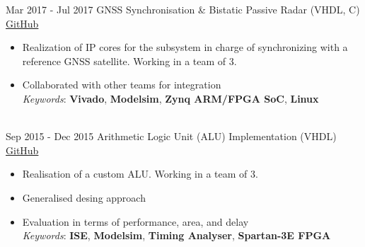 \documentclass[letterpaper]{twentysecondcv} %
\begin{document}
\begin{twenty}
	\twentyitem
    	{Mar 2017 -}
		{Jul 2017}
        {GNSS Synchronisation \& Bistatic Passive Radar (VHDL, C)}
        {\href{https://github.com/artic92/sistemi-embedded-task2}{GitHub}}
        {}
        {
            \begin{itemize}
                \item Realization of IP cores for the subsystem in charge of synchronizing with a reference GNSS satellite. Working in a team of 3.
                \item Collaborated with other teams for integration \\
                \textit{Keywords}: \textbf{Vivado}, \textbf{Modelsim}, \textbf{Zynq ARM/FPGA SoC}, \textbf{Linux}
		    \end{itemize}
        }\\
	\twentyitem
    	{Sep 2015 -}
		{Dec 2015}
        {Arithmetic Logic Unit (ALU) Implementation (VHDL)}
        {\href{https://github.com/artic92/alu_xilinx}{GitHub}}
        {}
        {
            \begin{itemize}
                \item Realisation of a custom ALU. Working in a team of 3.
                \item Generalised desing approach
                \item Evaluation in terms of performance, area, and delay \\
                \textit{Keywords}: \textbf{ISE}, \textbf{Modelsim}, \textbf{Timing Analyser}, \textbf{Spartan-3E FPGA}

\end{itemize}}
\end{twenty}
\end{document}
